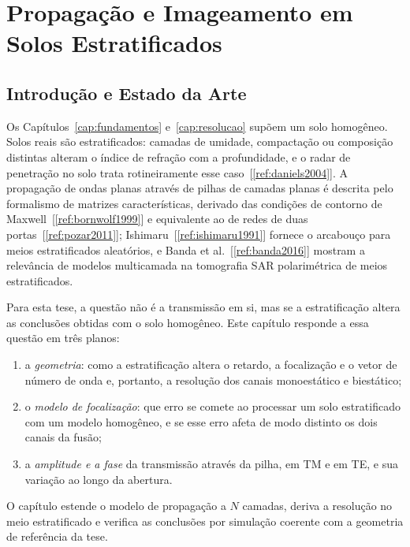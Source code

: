 \documentclass[12pt,a4paper,oneside]{book}
\theoremstyle{remark}
\newcommand{\citar}[1]{[\ref{ref:#1}]}
\theoremstyle{plain}
\theoremstyle{definition}
\begin{document}
\chapter{Propagação e Imageamento em Solos Estratificados}
\label{cap:multicamadas}

\section{Introdução e Estado da Arte}
\label{sec:multi_arte}

Os Capítulos~\ref{cap:fundamentos} e~\ref{cap:resolucao} supõem um solo
homogêneo. Solos reais são estratificados: camadas de umidade, compactação ou
composição distintas alteram o índice de refração com a profundidade, e o radar
de penetração no solo trata rotineiramente esse caso~\citar{daniels2004}. A
propagação de ondas planas através de pilhas de camadas planas é descrita pelo
formalismo de matrizes características, derivado das condições de contorno de
Maxwell~\citar{bornwolf1999} e equivalente ao de redes de duas
portas~\citar{pozar2011}; Ishimaru~\citar{ishimaru1991} fornece o arcabouço para
meios estratificados aleatórios, e Banda et al.~\citar{banda2016} mostram a
relevância de modelos multicamada na tomografia SAR polarimétrica de meios
estratificados.

Para esta tese, a questão não é a transmissão em si, mas se a estratificação
altera as conclusões obtidas com o solo homogêneo. Este capítulo responde a
essa questão em três planos:
\begin{enumerate}[label=(\roman*),leftmargin=*]
  \item a \emph{geometria}: como a estratificação altera o retardo, a
  focalização e o vetor de número de onda e, portanto, a resolução dos canais
  monoestático e biestático;
  \item o \emph{modelo de focalização}: que erro se comete ao processar um solo
  estratificado com um modelo homogêneo, e se esse erro afeta de modo distinto
  os dois canais da fusão;
  \item a \emph{amplitude e a fase} da transmissão através da pilha, em TM e em
  TE, e sua variação ao longo da abertura.
\end{enumerate}
O capítulo estende o modelo de propagação a $N$ camadas, deriva a resolução no
meio estratificado e verifica as conclusões por simulação coerente com a
geometria de referência da tese.
\end{document}
